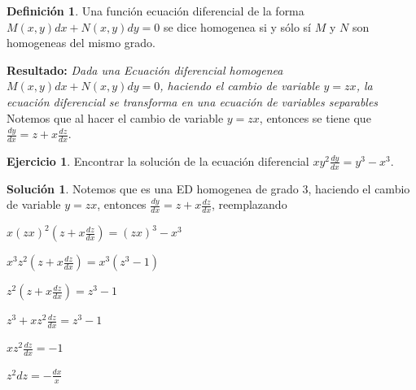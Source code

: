 \documentclass{article}
\theoremstyle{plain}
\theoremstyle{definition}
\newtheorem{defin}[thm]{Definición}
\newtheorem{ejer}[thm]{Ejercicio}
\newtheorem{sol}[thm]{Solución}
\begin{document}
\begin{defin}Una función ecuación diferencial de la forma $M(x,y)dx +N(x,y)dy=0$ se dice homogenea si y sólo sí $M$ y $N$ son homogeneas del mismo grado. \\
\end{defin}


\textbf{Resultado:} \textit{Dada una Ecuación diferencial homogenea $M(x,y)dx +N(x,y)dy=0$, haciendo el cambio de variable $y=zx$, la ecuación diferencial se transforma en una ecuación de variables separables}\\


Notemos que al hacer el cambio de variable $y=zx$, entonces se tiene que $\displaystyle \frac{dy}{dx}= z+x\frac{dz}{dx}$. \\


\begin{ejer}Encontrar la solución de la ecuación diferencial $\displaystyle xy^2\frac{dy}{dx} =y^3-x^3$.\\
\end{ejer}

\begin{sol}Notemos que es una ED homogenea de grado 3, haciendo el cambio de variable $y=zx$, entonces  $\displaystyle \frac{dy}{dx}= z+x\frac{dz}{dx}$, reemplazando
\end{sol}

\begin{center}
$\displaystyle  x(zx)^2 \left(  z+x\frac{dz}{dx} \right) =(zx)^3-x^3 $
\end{center}

\begin{center}
$\displaystyle  x^3z^2 \left(  z+x\frac{dz}{dx} \right) =x^3(z^3-1) $
\end{center}



\begin{center}
$\displaystyle  z^2 \left(  z+x\frac{dz}{dx} \right) =z^3-1 $
\end{center}

\begin{center}
$\displaystyle  z^3+xz^2\frac{dz}{dx} =z^3-1 $
\end{center}

\begin{center}
$\displaystyle  xz^2\frac{dz}{dx} =-1 $
\end{center}



\begin{center}
$\displaystyle  z^2dz =-\frac{dx}{x} $
\end{center}
\end{document}
